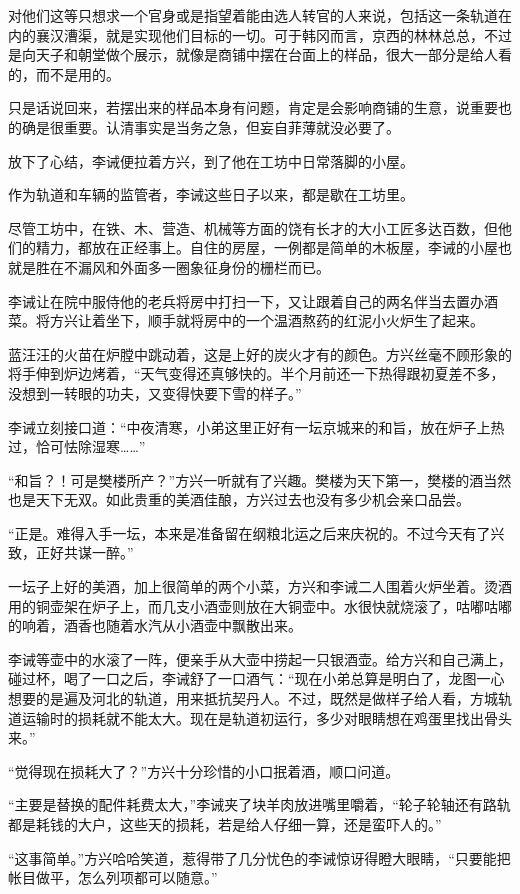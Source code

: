 对他们这等只想求一个官身或是指望着能由选人转官的人来说，包括这一条轨道在内的襄汉漕渠，就是实现他们目标的一切。可于韩冈而言，京西的林林总总，不过是向天子和朝堂做个展示，就像是商铺中摆在台面上的样品，很大一部分是给人看的，而不是用的。

只是话说回来，若摆出来的样品本身有问题，肯定是会影响商铺的生意，说重要也的确是很重要。认清事实是当务之急，但妄自菲薄就没必要了。

放下了心结，李诫便拉着方兴，到了他在工坊中日常落脚的小屋。

作为轨道和车辆的监管者，李诫这些日子以来，都是歇在工坊里。

尽管工坊中，在铁、木、营造、机械等方面的饶有长才的大小工匠多达百数，但他们的精力，都放在正经事上。自住的房屋，一例都是简单的木板屋，李诫的小屋也就是胜在不漏风和外面多一圈象征身份的栅栏而已。

李诫让在院中服侍他的老兵将房中打扫一下，又让跟着自己的两名伴当去置办酒菜。将方兴让着坐下，顺手就将房中的一个温酒熬药的红泥小火炉生了起来。

蓝汪汪的火苗在炉膛中跳动着，这是上好的炭火才有的颜色。方兴丝毫不顾形象的将手伸到炉边烤着，“天气变得还真够快的。半个月前还一下热得跟初夏差不多，没想到一转眼的功夫，又变得快要下雪的样子。”

李诫立刻接口道：“中夜清寒，小弟这里正好有一坛京城来的和旨，放在炉子上热过，恰可怯除湿寒……”

“和旨？！可是樊楼所产？”方兴一听就有了兴趣。樊楼为天下第一，樊楼的酒当然也是天下无双。如此贵重的美酒佳酿，方兴过去也没有多少机会亲口品尝。

“正是。难得入手一坛，本来是准备留在纲粮北运之后来庆祝的。不过今天有了兴致，正好共谋一醉。”

一坛子上好的美酒，加上很简单的两个小菜，方兴和李诫二人围着火炉坐着。烫酒用的铜壶架在炉子上，而几支小酒壶则放在大铜壶中。水很快就烧滚了，咕嘟咕嘟的响着，酒香也随着水汽从小酒壶中飘散出来。

李诫等壶中的水滚了一阵，便亲手从大壶中捞起一只银酒壶。给方兴和自己满上，碰过杯，喝了一口之后，李诫舒了一口酒气：“现在小弟总算是明白了，龙图一心想要的是遍及河北的轨道，用来抵抗契丹人。不过，既然是做样子给人看，方城轨道运输时的损耗就不能太大。现在是轨道初运行，多少对眼睛想在鸡蛋里找出骨头来。”

“觉得现在损耗大了？”方兴十分珍惜的小口抿着酒，顺口问道。

“主要是替换的配件耗费太大，”李诫夹了块羊肉放进嘴里嚼着，“轮子轮轴还有路轨都是耗钱的大户，这些天的损耗，若是给人仔细一算，还是蛮吓人的。”

“这事简单。”方兴哈哈笑道，惹得带了几分忧色的李诫惊讶得瞪大眼睛，“只要能把帐目做平，怎么列项都可以随意。”

